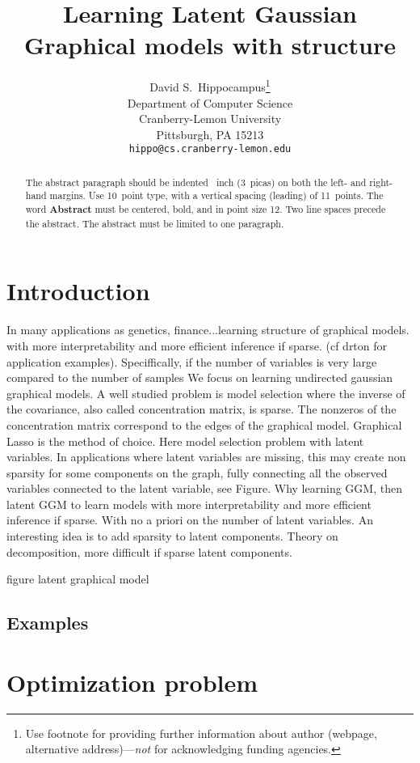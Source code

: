 \documentclass{article}
\title{Learning Latent Gaussian Graphical models with structure}
\author{
  David S.~Hippocampus\thanks{Use footnote for providing further
    information about author (webpage, alternative
    address)---\emph{not} for acknowledging funding agencies.} \\
  Department of Computer Science\\
  Cranberry-Lemon University\\
  Pittsburgh, PA 15213 \\
  \texttt{hippo@cs.cranberry-lemon.edu} \\
}
\begin{document}

\maketitle

\begin{abstract}
  The abstract paragraph should be indented ~inch
  (3~picas) on both the left- and right-hand margins. Use 10~point
  type, with a vertical spacing (leading) of 11~points.  The word
  \textbf{Abstract} must be centered, bold, and in point size 12. Two
  line spaces precede the abstract. The abstract must be limited to
  one paragraph.
\end{abstract}

\section{Introduction}

In many applications as genetics, finance...learning structure of graphical models. with more interpretability and more efficient inference if sparse. (cf drton for application examples). Speciffically, if the number of variables is very large compared to the number of samples
We focus on learning undirected gaussian graphical models. A well studied problem is model selection where the inverse of the covariance, also called concentration matrix, is sparse. The nonzeros of the concentration matrix correspond to the edges of the graphical model. Graphical Lasso is the method of choice.
Here model selection problem with latent variables. In applications where latent variables are missing, this may create non sparsity for some components on the graph, fully connecting all the observed variables connected to the latent variable, see Figure. 
Why learning GGM, then latent GGM to learn models with more interpretability and more efficient inference if sparse. With no a priori on the number of latent variables.
An interesting idea is to add sparsity to latent components. Theory on decomposition, more difficult if sparse latent components. 

figure latent graphical model

\subsection*{Examples}


\section{Optimization problem}
\label{optimization}
\end{document}

